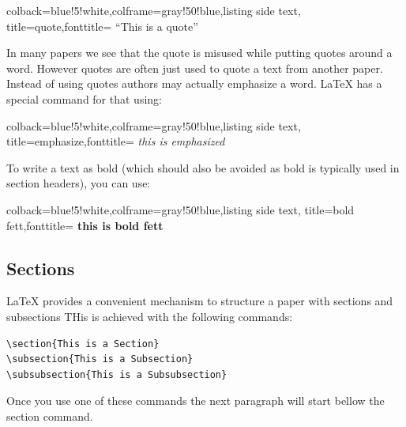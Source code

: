 \begin{tcblisting}{colback=blue!5!white,colframe=gray!50!blue,listing side text,
  title=quote,fonttitle=\bfseries}
``This is a quote''
\end{tcblisting}



In many papers we see that the quote is misused while putting quotes
around a word. However quotes are often just used to quote a text from
another paper. Instead of using quotes authors may actually emphasize a
word. LaTeX has a special command for that using:

\begin{tcblisting}{colback=blue!5!white,colframe=gray!50!blue,listing side text,
  title=emphasize,fonttitle=\bfseries}
{\em this is emphasized}
\end{tcblisting}

To write a text as bold (which should also be avoided as bold is
typically used in section headers), you can use:

\begin{tcblisting}{colback=blue!5!white,colframe=gray!50!blue,listing side text,
  title=bold fett,fonttitle=\bfseries}
{\bf this is bold fett}
\end{tcblisting}

\subsection{Sections}\label{sections}

LaTeX provides a convenient mechanism to structure a paper with sections
and subsections THis is achieved with the following commands:

\begin{verbatim}
\section{This is a Section}
\subsection{This is a Subsection}
\subsubsection{This is a Subsubsection}  
\end{verbatim}

Once you use one of these commands the next paragraph will start bellow
the section command.

